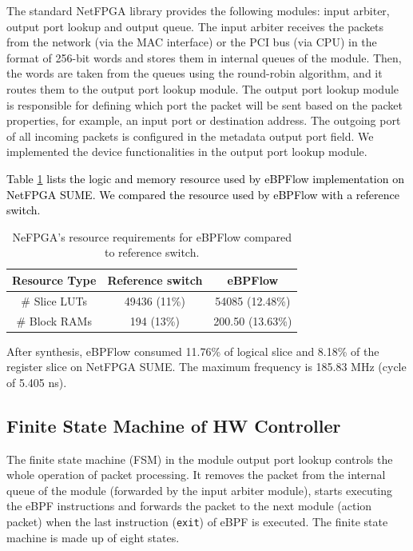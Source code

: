 The standard NetFPGA library provides the following modules: input arbiter, output port lookup and output queue. The input arbiter receives the packets from the network (via the MAC interface) or the PCI bus (via CPU) in the format of 256-bit words and stores them in internal queues of the module. Then, the words are taken from the queues using the round-robin algorithm, and it routes them to the output port lookup module.  The output port lookup module is responsible for defining which port the packet will be sent based on the packet properties, for example, an input port or destination address. The outgoing port of all incoming packets is configured in the metadata output port field. We implemented the device functionalities in the output port lookup module.

\textcolor{black}{Table \ref{tab:eBPFresource} lists the logic and memory resource used by eBPFlow implementation on NetFPGA SUME.  We compared the resource used by eBPFlow with a reference switch.}      

\begin{table}[tb]
\centering
\caption{NeFPGA's resource requirements for eBPFlow compared to reference switch.}
\label{tab:eBPFresource}
\begin{tabular}{|c|c|c|}
\hline
\textbf{Resource Type} & \textbf{Reference switch} & \textbf{eBPFlow} \\ \hline
\# Slice LUTs          & 49436 (11\%)              & 54085 (12.48\%)  \\ \hline
\# Block RAMs          & 194 (13\%)                & 200.50 (13.63\%) \\ \hline
\end{tabular}
\end{table}

After synthesis, eBPFlow consumed 11.76\% of logical slice and 8.18\% of the register slice on NetFPGA SUME. The maximum frequency is 185.83 MHz (cycle of 5.405 ns).

\subsection{Finite State Machine of HW Controller}

The finite state machine (FSM) in the module output port lookup controls the whole operation of packet processing. It removes the packet from the internal queue of the module (forwarded by the input arbiter module), starts executing the eBPF instructions and forwards the packet to the next module (action packet) when the last instruction (\texttt{exit}) of eBPF is executed. The finite state machine is made up of eight states.

